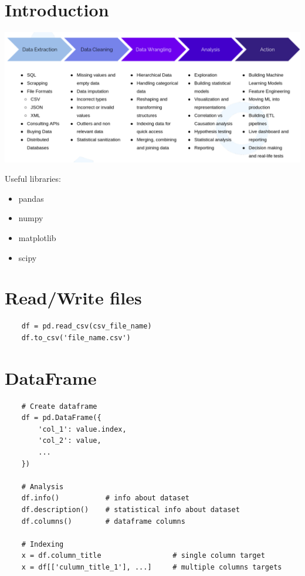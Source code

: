 \section{Introduction}

\includegraphics[scale=0.2]{pictures/data_analysis_process.png}

Useful libraries:
\begin{itemize}
  \item pandas
  \item numpy
  \item matplotlib
  \item scipy
\end{itemize}



\section{Read/Write files}

\begin{verbatim}
    df = pd.read_csv(csv_file_name)
    df.to_csv('file_name.csv')
\end{verbatim}


\section{DataFrame}

\begin{verbatim}
    # Create dataframe
    df = pd.DataFrame({
        'col_1': value.index,
        'col_2': value,
        ...
    })

    # Analysis
    df.info()           # info about dataset
    df.description()    # statistical info about dataset
    df.columns()        # dataframe columns

    # Indexing
    x = df.column_title                 # single column target
    x = df[['culumn_title_1'], ...]     # multiple columns targets

    
\end{verbatim}

